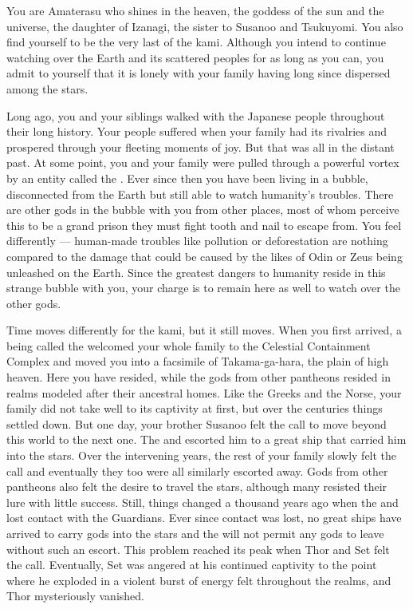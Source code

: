\documentclass[char]{guardians}
\begin{document}
\name{\cAmaterasu{}}

You are Amaterasu who shines in the heaven, the goddess of the sun and the universe, the daughter of Izanagi, the sister to Susanoo and Tsukuyomi. You also find yourself to be the very last of the kami. Although you intend to continue watching over the Earth and its scattered peoples for as long as you can, you admit to yourself that it is lonely with your family having long since dispersed among the stars.

Long ago, you and your siblings walked with the Japanese people throughout their long history. Your people suffered when your family had its rivalries and prospered through your fleeting moments of joy. But that was all in the distant past. At some point, you and your family were pulled through a powerful vortex by an entity called the \cWarden{}. Ever since then you have been living in a bubble, disconnected from the Earth but still able to watch humanity's troubles. There are other gods in the bubble with you from other places, most of whom perceive this to be a grand prison they must fight tooth and nail to escape from. You feel differently --- human-made troubles like pollution or deforestation are nothing compared to the damage that could be caused by the likes of Odin or Zeus being unleashed on the Earth. Since the greatest dangers to humanity reside in this strange bubble with you, your charge is to remain here as well to watch over the other gods.

Time moves differently for the kami, but it still moves. When you first arrived, a being called the \cCaretaker{} welcomed your whole family to the Celestial Containment Complex and moved you into a facsimile of Takama-ga-hara, the plain of high heaven. Here you have resided, while the gods from other pantheons resided in realms modeled after their ancestral homes. Like the Greeks and the Norse, your family did not take well to its captivity at first, but over the centuries things settled down. But one day, your brother Susanoo felt the call to move beyond this world to the next one. The \cCaretaker{} and \cWarden{} escorted him to a great ship that carried him into the stars. Over the intervening years, the rest of your family slowly felt the call and eventually they too were all similarly escorted away. Gods from other pantheons also felt the desire to travel the stars, although many resisted their lure with little success. Still, things changed a thousand years ago when the \cCaretaker{} and \cWarden{} lost contact with the Guardians. Ever since contact was lost, no great ships have arrived to carry gods into the stars and the \cWarden{} will not permit any gods to leave without such an escort. This problem reached its peak when Thor and Set felt the call. Eventually, Set was angered at his continued captivity to the point where he exploded in a violent burst of energy felt throughout the realms, and Thor mysteriously vanished.
\end{document}
